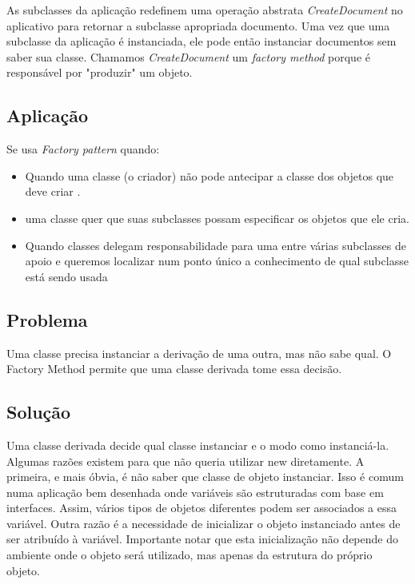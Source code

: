 As subclasses da aplicação redefinem uma operação abstrata \emph{CreateDocument} no 
aplicativo para retornar a subclasse apropriada documento. Uma vez que uma subclasse da aplicação é instanciada, ele pode então instanciar documentos sem saber sua classe. Chamamos \emph{CreateDocument} um \emph{factory method} porque é
responsável por "produzir" um objeto.\cite{gamma95}

\subsection{Aplicação}
\label{sub:fac_aplica}

Se usa \emph{Factory pattern} quando:\cite{gamma95}

\begin{itemize}
	\item Quando uma classe (o criador) não pode antecipar a classe dos objetos que deve criar
.	\item uma classe quer que suas subclasses possam especificar os objetos que ele cria.
	\item Quando classes delegam responsabilidade para uma entre várias subclasses de apoio e
queremos localizar num ponto único a conhecimento de qual subclasse está sendo usada

\end{itemize}


\subsection{Problema}
\label{sub:fac_problema}

Uma classe precisa instanciar a derivação de uma outra, mas não sabe qual. O Factory
Method permite que uma classe derivada tome essa decisão.

\subsection{Solução}
\label{sub:fac_solucao}

Uma classe derivada decide qual classe instanciar e o modo como instanciá-la.
Algumas razões existem para que não queria utilizar new diretamente. A primeira, e
mais óbvia, é não saber que classe de objeto instanciar.
Isso é comum numa aplicação bem desenhada onde variáveis são estruturadas com
base em interfaces. Assim, vários tipos de objetos diferentes podem ser associados a
essa variável. Outra razão é a necessidade de inicializar o objeto instanciado antes de ser
atribuído à variável. Importante notar
que esta inicialização não depende do ambiente onde o objeto será utilizado, mas apenas
da estrutura do próprio objeto.\cite{fact1}\cite{gamma95}



